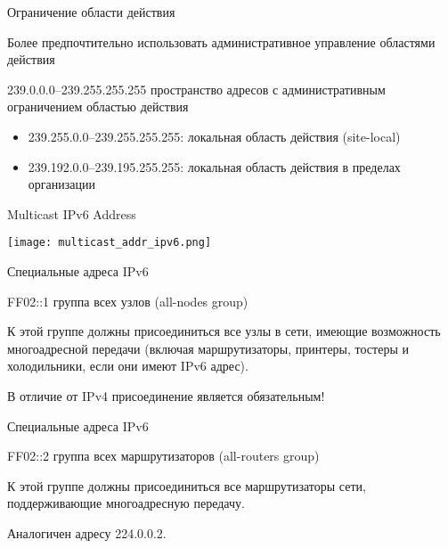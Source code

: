 \begin{frame}{Ограничение области действия}

	Более предпочтительно использовать административное управление областями действия

	\begin{block}{239.0.0.0--239.255.255.255}
		пространство адресов с административным ограничением областью действия
	\end{block}

	\begin{itemize}
		\item 239.255.0.0--239.255.255.255: локальная область действия (site-local)
		\item 239.192.0.0--239.195.255.255: локальная область действия в пределах организации
	\end{itemize}

\end{frame}

\begin{frame}{Multicast IPv6 Address}

	\center\texttt{[image: multicast\_addr\_ipv6.png]}



\end{frame}

\begin{frame}{Специальные адреса IPv6}
	\begin{block}{FF02::1}
		группа всех узлов (all-nodes group)
	\end{block}

	К этой группе должны присоединиться все узлы в сети,  имеющие возможность многоадресной передачи
	(включая маршрутизаторы,  принтеры,  тостеры и холодильники,  если они имеют IPv6 адрес).

	\bigskip

	В отличие от IPv4 присоединение является обязательным!
\end{frame}

\begin{frame}{Специальные адреса IPv6}
	\begin{block}{FF02::2}
		группа всех маршрутизаторов (all-routers group)
	\end{block}

	К этой группе должны присоединиться все маршрутизаторы сети,  поддерживающие многоадресную передачу.

	Аналогичен адресу 224.0.0.2.

\end{frame}


